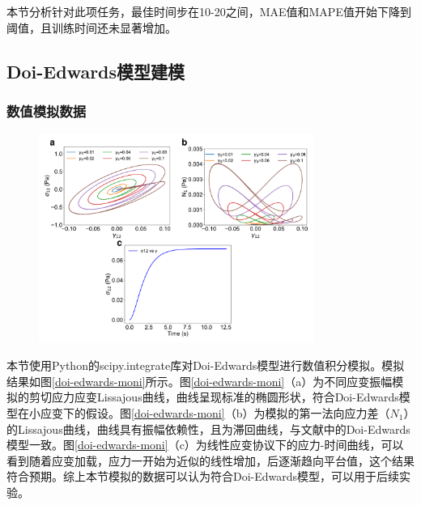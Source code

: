 本节分析针对此项任务，最佳时间步在10-20之间，MAE值和MAPE值开始下降到阈值，且训练时间还未显著增加。


\subsection{Doi-Edwards模型建模}
\subsubsection{数值模拟数据}
\begin{figure}[htbp]
  \centering
  \includegraphics[width=0.8\textwidth]{Fig/doi-edwards-moni.pdf}
\end{figure}
本节使用Python的scipy.integrate库对Doi-Edwards模型进行数值积分模拟。模拟结果如图\ref{doi-edwards-moni}所示。图\ref{doi-edwards-moni}（a）为不同应变振幅模拟的剪切应力应变Lissajous曲线，曲线呈现标准的椭圆形状，符合Doi-Edwards模型在小应变下的假设。图\ref{doi-edwards-moni}（b）为模拟的第一法向应力差（$N_1$）的Lissajous曲线，曲线具有振幅依赖性，且为滞回曲线，与文献中的Doi-Edwards模型一致。图\ref{doi-edwards-moni}（c）为线性应变协议下的应力-时间曲线，可以看到随着应变加载，应力一开始为近似的线性增加，后逐渐趋向平台值，这个结果符合预期。综上本节模拟的数据可以认为符合Doi-Edwards模型，可以用于后续实验。

